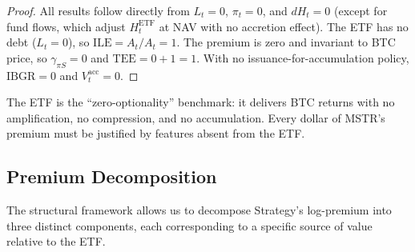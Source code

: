 \begin{proof}
All results follow directly from $L_t = 0$, $\pi_t = 0$, and $dH_t = 0$ (except for fund flows, which adjust $H_t^{\mathrm{ETF}}$ at NAV with no accretion effect). The ETF has no debt ($L_t = 0$), so $\mathrm{ILE} = A_t / A_t = 1$. The premium is zero and invariant to BTC price, so $\gamma_{\pi S} = 0$ and $\mathrm{TEE} = 0 + 1 = 1$. With no issuance-for-accumulation policy, $\mathrm{IBGR} = 0$ and $V_t^{\mathrm{acc}} = 0$.
\end{proof}

\begin{remark}
The ETF is the ``zero-optionality'' benchmark: it delivers BTC returns with no amplification, no compression, and no accumulation. Every dollar of MSTR's premium must be justified by features absent from the ETF.
\end{remark}

\subsection{Premium Decomposition}
\label{subsec:premium_decomp}

The structural framework allows us to decompose Strategy's log-premium into three distinct components, each corresponding to a specific source of value relative to the ETF.

